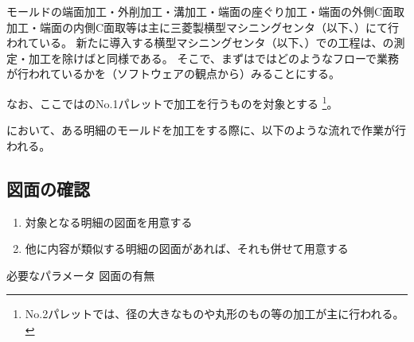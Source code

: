 

モールドの端面加工・外削加工・溝加工・端面の座ぐり加工・端面の外側C面取加工・端面の内側C面取等は主に三菱製横型マシニングセンタ（以下、\textbf{\MMname}）にて行われている。
新たに導入する横型マシニングセンタ（以下、\textbf{\DMname}）での工程は、\dimple の測定・加工を除けば\MMname と同様である。
そこで、まずは\MMname ではどのようなフローで業務が行われているかを（ソフトウェアの観点から）みることにする。

なお、ここでは\MMname のNo.1パレットで加工を行うものを対象とする
\footnote{No.2パレットでは、径の大きなものや丸形のもの等の加工が主に行われる。}。



\MMname において、ある明細のモールドを加工をする際に、以下のような流れで作業が行われる。


\subsection{図面の確認}
\begin{enumerate}
\item 対象となる明細の図面を用意する
\item 他に内容が類似する明細の図面があれば、それも併せて用意する
\end{enumerate}
\begin{Parameter}{必要なパラメータ}
図面の有無
\end{Parameter}


